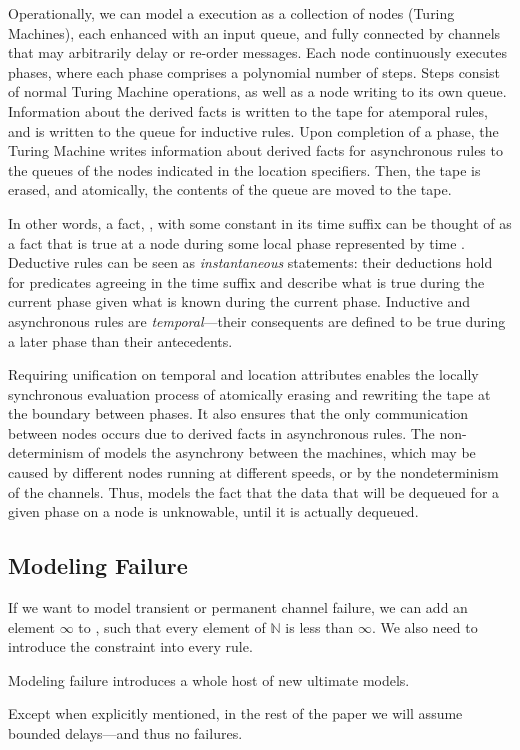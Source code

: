 Operationally, we can model a \lang execution as a collection of nodes (Turing Machines), each enhanced with an input queue, and fully connected by channels that may arbitrarily delay or re-order messages.  Each node continuously executes phases, where each phase comprises a polynomial number of steps.  Steps consist of normal Turing Machine operations, as well as a node writing to its own queue.  Information about the derived facts is written to the tape for atemporal rules, and is written to the queue for inductive rules.  Upon completion of a phase, the Turing Machine writes information about derived facts for asynchronous rules to the queues of the nodes indicated in the location specifiers.  Then, the tape is erased, and atomically, the contents of the queue are moved to the tape.

In other words, a fact, , with some constant  in its time suffix can be thought of as a fact that is true at a node during some local phase represented by time .  Deductive rules can be seen as {\em instantaneous} statements: their deductions hold for predicates agreeing in the time suffix and describe what is true during the current phase given what is known during the current phase. Inductive and asynchronous rules are {\em temporal}---their consequents are defined to be true during a later phase than their antecedents.

Requiring unification on temporal and location attributes enables the locally synchronous evaluation process of atomically erasing and rewriting the tape at the boundary between phases.  It also ensures that the only communication between nodes occurs due to derived facts in asynchronous rules.  The non-determinism of  models the asynchrony between the machines, which may be caused by different nodes running at different speeds, or by the nondeterminism of the channels. Thus,  models the fact that the data that will be dequeued for a given phase on a node is unknowable, until it is actually dequeued.

\subsection{Modeling Failure}

If we want \lang to model transient or permanent channel failure, we can add an element $\infty$ to , such that every element of $\mathbb{N}$ is less than $\infty$.  We also need to introduce the constraint  into every \lang rule.

Modeling failure introduces a whole host of new ultimate models. 

Except when explicitly mentioned, in the rest of the paper we will assume bounded delays---and thus no failures.

